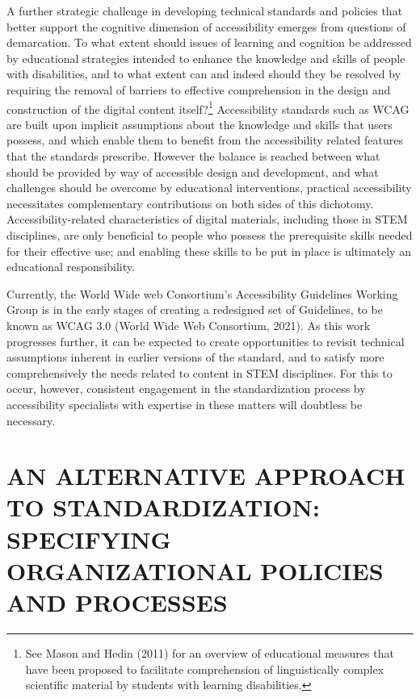 \documentclass{sig-alternate} %
\begin{document}
\begin{large}
A further strategic challenge in developing technical standards and policies that better support the cognitive dimension of accessibility emerges from questions of demarcation. To what extent should issues of learning and cognition be addressed by educational strategies intended to enhance the knowledge and skills of people with disabilities, and to what extent can and indeed should they be resolved by requiring the removal of barriers to effective comprehension in the design and construction of the digital content itself?\footnote{See Mason and Hedin (2011) for an overview of educational measures that have been proposed to facilitate comprehension of linguistically complex scientific material by students with learning disabilities.} Accessibility standards such as WCAG are built upon implicit assumptions about the knowledge and skills that users possess, and which enable them to benefit from the accessibility related features that the standards prescribe. However the balance is reached between what should be provided by way of accessible design and development, and what challenges should be overcome by educational interventions, practical accessibility necessitates complementary contributions on both sides of this dichotomy. Accessibility-related characteristics of digital materials, including those in STEM disciplines, are only beneficial to people who possess the prerequisite skills needed for their effective use; and enabling these skills to be put in place is ultimately an educational responsibility.

Currently, the World Wide web Consortium’s Accessibility Guidelines Working Group is in the early stages of creating a redesigned set of Guidelines, to be known as WCAG 3.0 (World Wide Web Consortium, 2021). As this work progresses further, it can be expected to create opportunities to revisit technical assumptions inherent in earlier versions of the standard, and to satisfy more comprehensively the needs related to content in STEM disciplines. For this to occur, however, consistent engagement in the standardization process by accessibility specialists with expertise in these matters will doubtless be necessary.
 
\section*{AN ALTERNATIVE APPROACH TO STANDARDIZATION: SPECIFYING ORGANIZATIONAL POLICIES AND PROCESSES}


\end{large}
\end{document}
